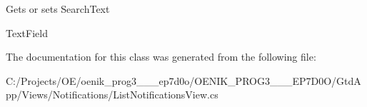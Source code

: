 Gets or sets Search\+Text 

Text\+Field

The documentation for this class was generated from the following file\+:\begin{DoxyCompactItemize}
\item 
C\+:/\+Projects/\+O\+E/oenik\+\_\+prog3\+\_\+\_\+\_\+ep7d0o/\+O\+E\+N\+I\+K\+\_\+\+P\+R\+O\+G3\+\_\+\_\+\_\+\+E\+P7\+D0\+O/\+Gtd\+App/\+Views/\+Notifications/List\+Notifications\+View.\+cs\end{DoxyCompactItemize}
